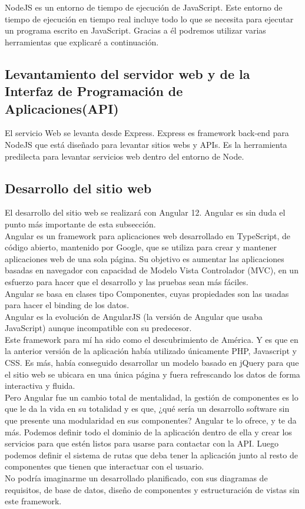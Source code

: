 NodeJS es un entorno de tiempo de ejecución de JavaScript. Este entorno de tiempo de ejecución en tiempo real incluye todo lo que se necesita para ejecutar un programa escrito en JavaScript. Gracias a él podremos utilizar varias herramientas que explicaré a continuación.

\subsection{Levantamiento del servidor web y de la Interfaz de Programación de Aplicaciones(API)}

El servicio Web se levanta desde Express. Express es framework back-end para NodeJS que está diseñado para levantar sitios webs y APIs. Es la herramienta predilecta para levantar servicios web dentro del entorno de Node.

\subsection{Desarrollo del sitio web}

El desarrollo del sitio web se realizará con Angular 12. Angular es sin duda el punto más importante de esta subsección.
\\Angular es un framework para aplicaciones web desarrollado en TypeScript, de código abierto, mantenido por Google, que se utiliza para crear y mantener aplicaciones web de una sola página. Su objetivo es aumentar las aplicaciones basadas en navegador con capacidad de Modelo Vista Controlador (MVC), en un esfuerzo para hacer que el desarrollo y las pruebas sean más fáciles.
\\Angular se basa en clases tipo Componentes, cuyas propiedades son las usadas para hacer el binding de los datos.
\\Angular es la evolución de AngularJS (la versión de Angular que usaba JavaScript) aunque incompatible con su predecesor.
\\Este framework para mí ha sido como el descubrimiento de América. Y es que en la anterior versión de la aplicación había utilizado únicamente PHP, Javascript y CSS. Es más, había conseguido desarrollar un modelo basado en jQuery para que el sitio web se ubicara en una única página y fuera refrescando los datos de forma interactiva y fluida. 
\\Pero Angular fue un cambio total de mentalidad, la gestión de componentes es lo que le da la vida en su totalidad y es que, ¿qué sería un desarrollo software sin que presente una modularidad en sus componentes? Angular te lo ofrece, y te da más. Podemos definir todo el dominio de la aplicación dentro de ella y crear los servicios para que estén listos para usarse para contactar con la API. Luego podemos definir el sistema de rutas que deba tener la aplicación junto al resto de componentes que tienen que interactuar con el usuario.
\\No podría imaginarme un desarrollado planificado, con sus diagramas de requisitos, de base de datos, diseño de componentes y estructuración de vistas sin este framework.

